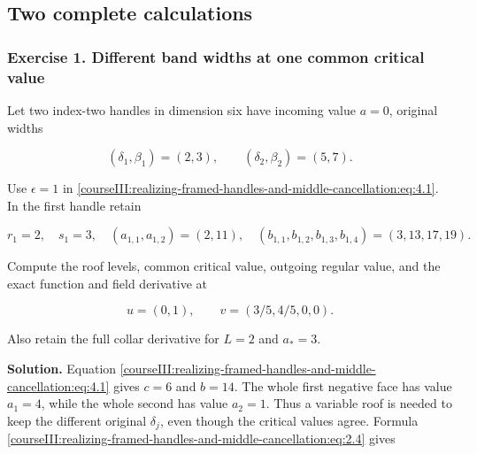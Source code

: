 \subsection{Two complete calculations}
\label{courseIII:realizing-framed-handles-and-middle-cancellation:middle-realization-exercises}

\label{courseIII:realizing-framed-handles-and-middle-cancellation:section-7}

\subsubsection{Exercise 1. Different band widths at one common critical value}
\label{courseIII:realizing-framed-handles-and-middle-cancellation:exercise-1}

\label{courseIII:middle-cancel:7.1}

Let two index-two handles in dimension six have incoming value \(a=0\), original widths

\begin{equation}
(\delta_1,\beta_1)=(2,3),\qquad
 (\delta_2,\beta_2)=(5,7).
 \label{courseIII:realizing-framed-handles-and-middle-cancellation:eq:7.1}
\end{equation}

Use \(\epsilon=1\) in \eqref{courseIII:realizing-framed-handles-and-middle-cancellation:eq:4.1}. In the first handle retain

\begin{equation}
r_1=2,\quad s_1=3,\quad
 (a_{1,1},a_{1,2})=(2,11),\quad
 (b_{1,1},b_{1,2},b_{1,3},b_{1,4})=(3,13,17,19).
 \label{courseIII:realizing-framed-handles-and-middle-cancellation:eq:7.2}
\end{equation}

Compute the roof levels, common critical value, outgoing regular value, and the exact function and field derivative at

\begin{equation}
u=(0,1),\qquad v=(3/5,4/5,0,0).
 \label{courseIII:realizing-framed-handles-and-middle-cancellation:eq:7.3}
\end{equation}

Also retain the full collar derivative for \(L=2\) and \(a_*=3\).

\textbf{Solution.} Equation \eqref{courseIII:realizing-framed-handles-and-middle-cancellation:eq:4.1} gives \(c=6\) and \(b=14\). The whole first negative face has value \(a_1=4\), while the whole second has value \(a_2=1\). Thus a variable roof is needed to keep the different original \(\delta_j\), even though the critical values agree. Formula \eqref{courseIII:realizing-framed-handles-and-middle-cancellation:eq:2.4} gives

